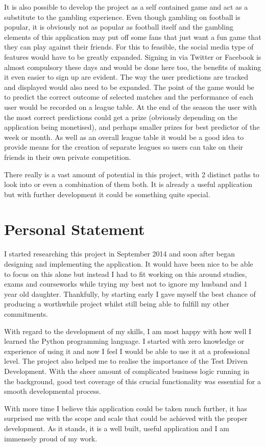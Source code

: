 It is also possible to develop the project as a self contained game and act as a substitute to the gambling experience. Even though gambling on football is popular, it is obviously not as popular as football itself and the gambling elements of this application may put off some fans that just want a fun game that they can play against their friends. For this to feasible, the social media type of features would have to be greatly expanded. Signing in via Twitter or  Facebook is almost compulsory these days and would be done here too, the benefits of making it even easier to sign up are evident. The way the user predictions are tracked and displayed would also need to be expanded. The point of the game would be to predict the correct outcome of selected matches and the performance of each user would be recorded on a league table. At the end of the season the user with the most correct predictions could get a prize (obviously depending on the application being monetised),  and perhaps smaller prizes for best predictor of the week or month. As well as an overall league table it would be a good idea to provide means for the creation of separate leagues so users can take on their friends in their own private competition.

There really is a vast amount of potential in this project, with 2 distinct paths to look into or even a combination of them both. It is already a useful application but with further development it could be something quite special.

\section{Personal Statement}
\label{sec:personalstatement_conclusion}
I started researching this project in September 2014 and soon after began designing and implementing the application. It would have been nice to be able to focus on this alone but instead I had to fit working on this around studies, exams and courseworks while trying my best not to ignore my husband and 1 year old daughter. Thankfully, by starting early I gave myself the best chance of producing a worthwhile project whilst still being able to fulfill my other commitments.

With regard to the development of my skills, I am most happy with how well I learned the Python programming language. I started with zero knowledge or experience of using it and now I feel I would be able to use it at a professional level. The project also helped me to realise the importance of the Test Driven Development. With the sheer amount of complicated business logic running in the background, good test coverage of this crucial functionality was essential for a smooth developmental process. 

With more time I believe this application could be taken much further, it has surprised me with the scope and scale that could be achieved with the proper development. As it stands, it is a well built, useful application and I am immensely proud of my work. 